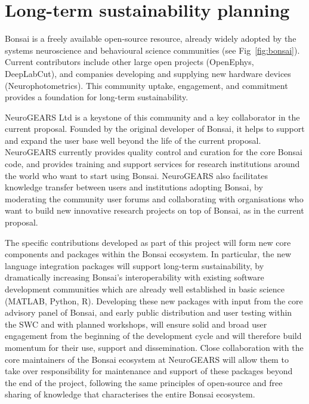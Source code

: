 \section{Long-term sustainability planning}

Bonsai is a freely available open-source resource, already widely adopted by
the systems neuroscience and behavioural science communities (see Fig~\ref{fig:bonsai}).  
%
Current contributors include other large open projects (OpenEphys, DeepLabCut),
and companies developing and supplying new hardware devices  (Neurophotometrics).
%
This community uptake, engagement, and commitment provides a foundation for
long-term sustainability.

NeuroGEARS Ltd is a keystone of this community and a key collaborator in the current proposal.
Founded by the original developer of Bonsai, it helps to support and expand the
user base well beyond the life of the current proposal. NeuroGEARS currently provides
quality control and curation for the core Bonsai code, and provides training and support
services for research institutions around the world who want to start using Bonsai.
NeuroGEARS also facilitates knowledge transfer between users and institutions adopting
Bonsai, by moderating the community user forums and collaborating with organisations
who want to build new innovative research projects on top of Bonsai, as in the
current proposal.

The specific contributions developed as part of this project will form new core
components and packages within the Bonsai ecosystem. In particular, the new language integration packages will support long-term sustainability, by dramatically
increasing Bonsai's interoperability with existing software development communities which are
already well established in basic science (MATLAB, Python, R).
%
Developing these new packages with input from the core advisory panel of Bonsai,
and early public distribution and user testing within the SWC and with planned workshops, will ensure
solid and broad user engagement from the beginning of the development cycle and will therefore
build momentum for their use, support and dissemination.
%
Close collaboration with the core maintainers of the Bonsai ecosystem at NeuroGEARS will
allow them to take over responsibility for maintenance and support of these packages beyond the
end of the project, following the same principles of open-source and free sharing of knowledge
that characterises the entire Bonsai ecosystem.

